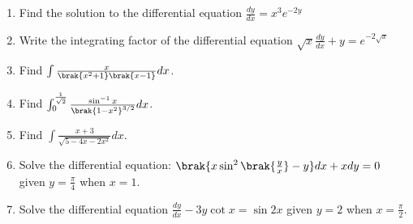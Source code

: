 \begin{enumerate}
\item Find the solution to the differential equation 
$\frac{dy}{dx} = x^{3}e^{-2y}$

\item Write the integrating factor of the differential equation
$\sqrt{x}\frac{dy}{dx} + y = e^{-2\sqrt{x}}$ 

\item Find $\int \frac{x}{\brak{x^2+1}\brak{x-1}}dx$.

\item Find $\int_{0}^{\frac{1}{\sqrt{2}}} \frac{\sin^{-1}x}{{\brak{1-x^2}}^{3/2}}dx$.

\item Find $\int \frac{x+3}{\sqrt{5-4x-2x^2}}dx$.

\item Solve the differential equation: 
$\brak{x\sin^2{\brak{\frac{y}{x}}}-y}dx +xdy = 0$ given $y = \frac{\pi}{4}$ when $x=1$.

\item Solve the differential equation $\frac{dy}{dx}-3y\cot{x} = \sin{2x}$ given $y=2$ when $x=\frac{\pi}{2}$.
\end{enumerate}
